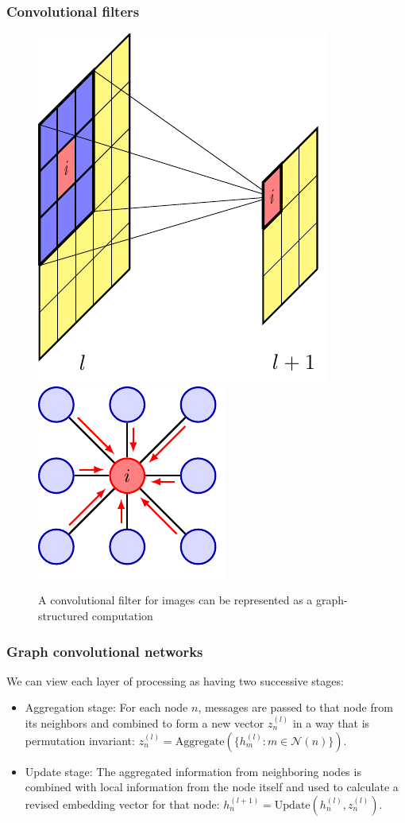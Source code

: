 \documentclass{beamer}
\begin{document}
\begin{frame}
    \frametitle{Convolutional filters}
    \begin{figure}
        \caption{A convolutional filter for images can be represented as a graph-structured computation}
        \includegraphics[height=0.6\textheight,trim=0 0 -1cm 0]{Figure_3_a.pdf}
        \includegraphics[trim=-1cm 0 0 0]{Figure_3_b.pdf}
    \end{figure}
\end{frame}

\begin{frame}
    \frametitle{Graph convolutional networks}
    We can view each layer of processing as having two successive stages:
    \begin{itemize}
        \item Aggregation stage: For each node $n$, messages are passed to that node from its neighbors and combined to form a new vector $z^{(l)}_{n}$ in a way that is permutation invariant: $z^{(l)}_{n}=\mathrm{Aggregate}(\{h^{(l)}_{m}:m\in\mathcal{N}(n)\})$.
        \item Update stage: The aggregated information from neighboring nodes is combined with local information from the node itself and used to calculate a revised embedding vector for that node: $h^{(l+1)}_{n}=\mathrm{Update}(h^{(l)}_{n},z^{(l)}_{n})$.
    \end{itemize}
\end{frame}
\end{document}
